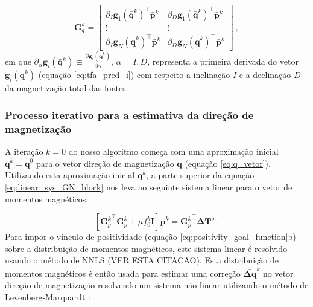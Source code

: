 \begin{equation}
\mathbf{G}_{q}^{k} = \begin{bmatrix}
\partial_{I} \mathbf{g}_{1}(\bar{\mathbf{q}}^{k})^{\top} \bar{\mathbf{p}}^{k} & 
\partial_{D} \mathbf{g}_{1}(\bar{\mathbf{q}}^{k})^{\top} \bar{\mathbf{p}}^{k} \\
\vdots & \vdots  \\
\partial_{I} \mathbf{g}_{N}(\bar{\mathbf{q}}^{k})^{\top} \bar{\mathbf{p}}^{k} & 
\partial_{D} \mathbf{g}_{N}(\bar{\mathbf{q}}^{k})^{\top} \bar{\mathbf{p}}^{k} 
\end{bmatrix} \: ,
\label{eq:Gq}
\end{equation}
em que $\partial_{\alpha} \mathbf{g}_{i}(\bar{\mathbf{q}}^{k}) \equiv \frac{\partial \mathbf{g}_{i}(\bar{\mathbf{q}}^{k})}{\partial \alpha}$, $\alpha= I, D$, representa a primeira derivada do vetor $\mathbf{g}_{i}(\bar{\mathbf{q}}^{k})$ (equação \ref{eq:tfa_pred_i}) com respeito a inclinação $I$ e a declinação $D$ da magnetização total das fontes.

\subsubsection{Processo iterativo para a estimativa da direção de magnetização}

A iteração $k=0$ do nosso algoritmo começa com uma aproximação inicial $\bar{\mathbf{q}}^{k} = \bar{\mathbf{q}}^{0}$ para o vetor direção de magnetização $\mathbf{q}$ (equação \ref{eq:q_vetor}). Utilizando esta aproximação inicial $\bar{\mathbf{q}}^{k}$, a parte superior da equação \ref{eq:linear_sys_GN_block} nos leva ao seguinte sistema linear para o vetor de momentos magnéticos:

\begin{equation}
\left[ {\mathbf{G}_{p}^{k}}^{\top} \mathbf{G}_{p}^{k} + 
\mu f_{0}^{k} \mathbf{I} \right] \bar{\mathbf{p}}^{k} = {\mathbf{G}_{p}^{k}}^{\top} \mathbf{\Delta T}^{o} \: .
\label{eq:linear_sys_p}
\end{equation}
Para impor o vínculo de positividade (equação \ref{eq:positivity_goal_function}b) sobre a distribuição de momentos magnéticos, este sistema linear é resolvido usando o método de NNLS \citep{lawson_hanson_1974, silvadias_etal_2007} (VER ESTA CITACAO). Esta distribuição de momentos magnéticos é então usada para estimar uma correção $\bar{\mathbf{\Delta q}}^{k}$ no vetor direção de magnetização resolvendo um sistema não linear utilizando o método de Levenberg-Marquardt \citep{aster2005}:

